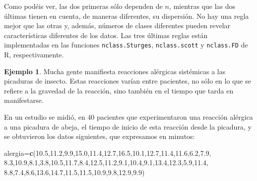 \documentclass[
]{book}
\newenvironment{Shaded}{\begin{snugshade}}{\end{snugshade}}
\newcommand{\FloatTok}[1]{\textcolor[rgb]{0.00,0.00,0.81}{#1}}
\newcommand{\KeywordTok}[1]{\textcolor[rgb]{0.13,0.29,0.53}{\textbf{#1}}}
\newcommand{\NormalTok}[1]{#1}
\theoremstyle{definition}
\theoremstyle{definition}
\newtheorem{example}{Ejemplo}[chapter]
\theoremstyle{definition}
\theoremstyle{remark}
\begin{document}
Como podéis ver, las dos primeras sólo dependen de \(n\), mientras que las dos últimas tienen en cuenta, de maneras diferentes, su dispersión. No hay una regla mejor que las otras y, además, números de clases diferentes pueden revelar características diferentes de los datos. Las tres últimas reglas están implementadas en las funciones \texttt{nclass.Sturges}, \texttt{nclass.scott} y \texttt{nclass.FD} de R, respectivamente.

\begin{example}
\protect\hypertarget{exm:alerg}{}{\label{exm:alerg} }Mucha gente manifiesta reacciones alérgicas sistémicas a las picaduras de insecto.
Estas reacciones varían entre pacientes, no sólo en lo que se refiere a la gravedad de la reacción,
sino también en el tiempo que tarda en manifestarse.

En un estudio se midió, en 40 pacientes que experimentaron una reacción alérgica a una picadura de abeja,
el tiempo de inicio de esta reacción desde la picadura, y se obtuvieron los datos siguientes, que expresamos en minutos:
\end{example}

\begin{Shaded}
\begin{Highlighting}[]
\NormalTok{alergia=}\KeywordTok{c}\NormalTok{(}\FloatTok{10.5}\NormalTok{,}\FloatTok{11.2}\NormalTok{,}\FloatTok{9.9}\NormalTok{,}\FloatTok{15.0}\NormalTok{,}\FloatTok{11.4}\NormalTok{,}\FloatTok{12.7}\NormalTok{,}\FloatTok{16.5}\NormalTok{,}\FloatTok{10.1}\NormalTok{,}\FloatTok{12.7}\NormalTok{,}\FloatTok{11.4}\NormalTok{,}\FloatTok{11.6}\NormalTok{,}\FloatTok{6.2}\NormalTok{,}\FloatTok{7.9}\NormalTok{,}
  \FloatTok{8.3}\NormalTok{,}\FloatTok{10.9}\NormalTok{,}\FloatTok{8.1}\NormalTok{,}\FloatTok{3.8}\NormalTok{,}\FloatTok{10.5}\NormalTok{,}\FloatTok{11.7}\NormalTok{,}\FloatTok{8.4}\NormalTok{,}\FloatTok{12.5}\NormalTok{,}\FloatTok{11.2}\NormalTok{,}\FloatTok{9.1}\NormalTok{,}\FloatTok{10.4}\NormalTok{,}\FloatTok{9.1}\NormalTok{,}\FloatTok{13.4}\NormalTok{,}\FloatTok{12.3}\NormalTok{,}\FloatTok{5.9}\NormalTok{,}\FloatTok{11.4}\NormalTok{,}
  \FloatTok{8.8}\NormalTok{,}\FloatTok{7.4}\NormalTok{,}\FloatTok{8.6}\NormalTok{,}\FloatTok{13.6}\NormalTok{,}\FloatTok{14.7}\NormalTok{,}\FloatTok{11.5}\NormalTok{,}\FloatTok{11.5}\NormalTok{,}\FloatTok{10.9}\NormalTok{,}\FloatTok{9.8}\NormalTok{,}\FloatTok{12.9}\NormalTok{,}\FloatTok{9.9}\NormalTok{)}
\end{Highlighting}
\end{Shaded}
\end{document}
